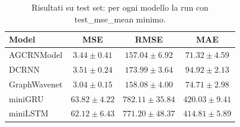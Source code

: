 \begin{table}
\caption{Risultati su test set: per ogni modello la run con test\_mse\_mean minimo.}
\label{tab:test_min_per_model}
\begin{tabular}{lccc}
\toprule
Model & MSE & RMSE & MAE \\
\midrule
AGCRNModel & $3.44 \pm 0.41$ & $157.04 \pm 6.92$ & $71.32 \pm 4.59$ \\
DCRNN & $3.51 \pm 0.24$ & $173.99 \pm 3.64$ & $94.92 \pm 2.13$ \\
GraphWavenet & $3.04 \pm 0.15$ & $158.08 \pm 4.00$ & $74.71 \pm 2.98$ \\
miniGRU & $63.82 \pm 4.22$ & $782.11 \pm 35.84$ & $420.03 \pm 9.41$ \\
miniLSTM & $62.12 \pm 6.43$ & $771.20 \pm 48.37$ & $414.81 \pm 5.89$ \\
\bottomrule
\end{tabular}
\end{table}
